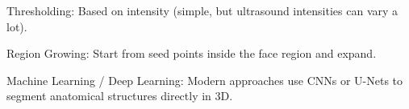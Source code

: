 
Thresholding: Based on intensity (simple, but ultrasound intensities can vary a lot).

Region Growing: Start from seed points inside the face region and expand.

Machine Learning / Deep Learning: Modern approaches use CNNs or U-Nets to segment anatomical structures directly in 3D.
